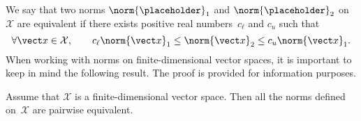 We say that two norms $\norm{\placeholder}_1$ and $\norm{\placeholder}_2$ on $\mathcal X$ are equivalent if
there exists positive real numbers~$c_{\ell}$ and $c_u$ such that
\begin{equation}
    \label{eq:norm_equilavence}
    \forall \vect x \in \mathcal X,
    \qquad c_{\ell} \norm{\vect x}_1
    \leq \norm{\vect x}_2
    \leq c_u \norm{\vect x}_1.
\end{equation}
When working with norms on finite-dimensional vector spaces,
it is important to keep in mind the following result.
The proof is provided for information purposes.
\begin{proposition}
    Assume that $\mathcal X$ is a finite-dimensional vector space.
    Then all the norms defined on~$\mathcal X$ are pairwise equivalent.
\end{proposition}
